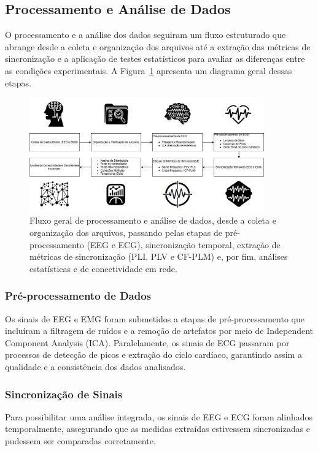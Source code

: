 \subsection{Processamento e Análise de Dados}

O processamento e a análise dos dados seguiram um fluxo estruturado que abrange desde a coleta e organização dos arquivos até a extração das métricas de sincronização e a aplicação de testes estatísticos para avaliar as diferenças entre as condições experimentais. A Figura~\ref{fig:fluxo_processamento} apresenta um diagrama geral dessas etapas.

\begin{figure}[htb]
    \centering
    \includegraphics[width=0.9\textwidth]{figs/0_intro_e_desenho_experimental/diagrama_processamento_e_analise_drawio.png}
    \caption{Fluxo geral de processamento e análise de dados, desde a coleta e organização dos arquivos, passando pelas etapas de pré-processamento (EEG e ECG), sincronização temporal, extração de métricas de sincronização (PLI, PLV e CF-PLM) e, por fim, análises estatísticas e de conectividade em rede.}
    \label{fig:fluxo_processamento}
\end{figure}

\subsubsection{Pré-processamento de Dados}
Os sinais de EEG e EMG foram submetidos a etapas de pré-processamento que incluíram a filtragem de ruídos e a remoção de artefatos por meio de Independent Component Analysis (ICA). Paralelamente, os sinais de ECG passaram por processos de detecção de picos e extração do ciclo cardíaco, garantindo assim a qualidade e a consistência dos dados analisados.

\subsubsection{Sincronização de Sinais}
Para possibilitar uma análise integrada, os sinais de EEG e ECG foram alinhados temporalmente, assegurando que as medidas extraídas estivessem sincronizadas e pudessem ser comparadas corretamente.

